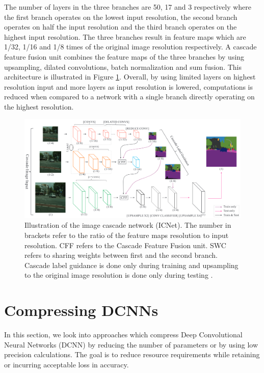 The number of layers in the three branches are 50, 17 and 3 respectively where the first branch operates on the lowest input resolution, the second branch operates on half the input resolution and the third branch operates on the highest input resolution. The three branches result in feature maps which are 1/32, 1/16 and 1/8 times of the original image resolution respectively. A cascade feature fusion unit combines the feature maps of the three branches by using upsampling, dilated convolutions, batch normalization and sum fusion. This architecture is illustrated in Figure \ref{Fig:icnet}. Overall, by using limited layers on highest resolution input and more layers as input resolution is lowered, computations is reduced when compared to a network with a single branch directly operating on the highest resolution. 

	\begin{figure}
		\centering
		\includegraphics[width=1\linewidth]{images/icnet}
		\caption{Illustration of the image cascade network (ICNet). The number in brackets refer to the ratio of the feature maps resolution to input resolution. CFF refers to the Cascade Feature Fusion unit. SWC refers to sharing weights between first and the second branch. Cascade label guidance is done only during training and upsampling to the original image resolution is done only during testing \cite{DBLP:journals/corr/ZhaoQSSJ17}.}
		\label{Fig:icnet}
	\end{figure}

\section{Compressing DCNNs}
\label{section:compress}

In this section, we look into approaches which compress Deep Convolutional Neural Networks (DCNN) by reducing the number of parameters or by using low precision calculations. The goal is to reduce resource requirements while retaining or incurring acceptable loss in accuracy. 

